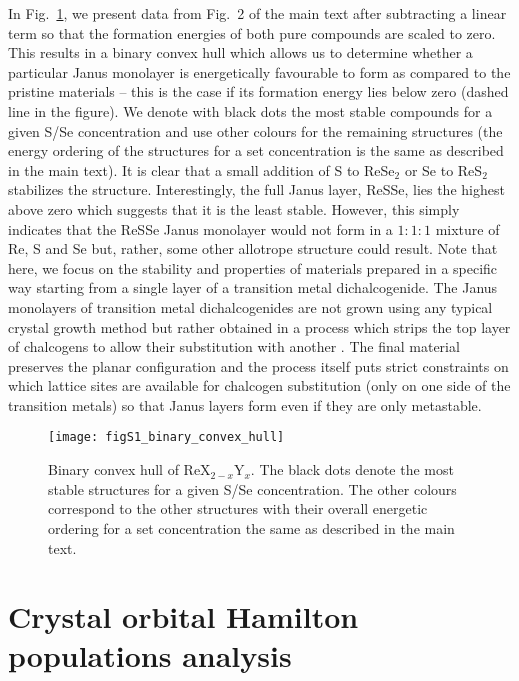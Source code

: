 \documentclass[superscriptaddress, amsmath,amssymb, preprint]{revtex4-2}
\newcounter{bla}
\begin{document}
In Fig.~\ref{fig:convex_hull}, we present data from Fig.~2 of the main text after subtracting a linear term so that the formation energies of both pure compounds are scaled to zero. This results in a binary convex hull which allows us to determine whether a particular Janus monolayer is energetically favourable to form as compared to the pristine materials -- this is the case if its formation energy lies below zero (dashed line in the figure). We denote with black dots the most stable compounds for a given S/Se concentration and use other colours for the remaining structures (the energy ordering of the structures for a set concentration is the same as described in the main text). It is clear that a small addition of S to ReSe$_{2}$ or Se to ReS$_{2}$ stabilizes the structure. Interestingly, the full Janus layer, ReSSe, lies the highest above zero which suggests that it is the least stable. However, this simply indicates that the ReSSe Janus monolayer would not form in a $1:1:1$ mixture of Re, S and Se but, rather, some other allotrope structure could result. Note that here, we focus on the stability and properties of materials prepared in a specific way starting from a single layer of a transition metal dichalcogenide. The Janus monolayers of transition metal dichalcogenides are not grown using any typical crystal growth method but rather obtained in a process which strips the top layer of chalcogens to allow their substitution with another \cite{lu_natnano_2017, zhang_acsnano_2017, Sant_2020}. The final material preserves the planar configuration and the process itself puts strict constraints on which lattice sites are available for chalcogen substitution (only on one side of the transition metals) so that Janus layers form even if they are only metastable. 

\begin{figure}[t]
\begin{center}
\texttt{[image: figS1\_binary\_convex\_hull]}
\caption{Binary convex hull of ReX$_{2-x}$Y$_{x}$. The black dots denote the most stable structures for a given S/Se concentration. The other colours correspond to the other structures with their overall energetic ordering for a set concentration the same as described in the main text.}
\label{fig:convex_hull}
\end{center}
\end{figure}

\section{Crystal orbital Hamilton populations analysis}
\end{document}

